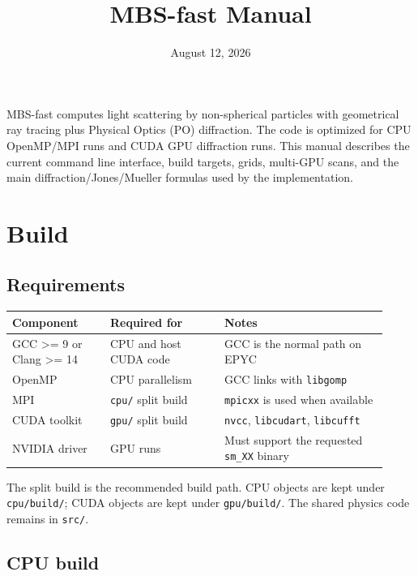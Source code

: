 \documentclass[
  10pt,
  a4paper,
]{article}
\title{MBS-fast Manual}
\author{}
\date{August 12, 2026}
\begin{document}
\maketitle

\renewcommand*\contentsname{Contents}
{
\setcounter{tocdepth}{3}
\tableofcontents
}
MBS-fast computes light scattering by non-spherical particles with
geometrical ray tracing plus Physical Optics (PO) diffraction. The code
is optimized for CPU OpenMP/MPI runs and CUDA GPU diffraction runs. This
manual describes the current command line interface, build targets,
grids, multi-GPU scans, and the main diffraction/Jones/Mueller formulas
used by the implementation.


\clearpage

\section{Build}\label{build}

\subsection{Requirements}\label{requirements}

\begin{longtable}[]{@{}L{0.24\linewidth}L{0.28\linewidth}L{0.40\linewidth}@{}}
\toprule\noalign{}
Component & Required for & Notes \\
\midrule\noalign{}
\endhead
\bottomrule\noalign{}
\endlastfoot
GCC \textgreater= 9 or Clang \textgreater= 14 & CPU and host CUDA code &
GCC is the normal path on EPYC \\
OpenMP & CPU parallelism & GCC links with \texttt{libgomp} \\
MPI & \texttt{cpu/} split build & \texttt{mpicxx} is used when
available \\
CUDA toolkit & \texttt{gpu/} split build & \texttt{nvcc},
\texttt{libcudart}, \texttt{libcufft} \\
NVIDIA driver & GPU runs & Must support the requested \texttt{sm\_XX}
binary \\
\end{longtable}

The split build is the recommended build path. CPU objects are kept
under \texttt{cpu/build/}; CUDA objects are kept under
\texttt{gpu/build/}. The shared physics code remains in \texttt{src/}.

\subsection{CPU build}\label{cpu-build}
\end{document}
